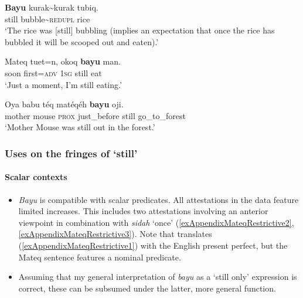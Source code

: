 \begin{exe}
	\ex \label{exAppendixMateq1}
	\gll \textbf{Bayu} kurak\sim kurak tubiq.\\
	still bubble\sim\textsc{redupl} rice\\
	\glt \lq The rice was [still] bubbling (implies an expectation that once the rice has bubbled it will be scooped out and eaten).\rq{ }\parencite[137–138]{Connell2013}
	
	\ex \label{exAppendixMateq2}
	\gll  Mateq tuet=n, okoq \textbf{bayu} man.\\
	soon first=\textsc{adv} 1\textsc{sg} still eat\\
	\glt \lq Just a moment, I'm still eating.' \parencite[148]{Connell2013}

	\ex \label{exAppendixMateq3}
	\gll Oya babu téq matéqéh \textbf{bayu} oji.\\
	mother mouse \textsc{prox} just\_before still go\_to\_forest\\
	\glt \lq Mother Mouse was still out in the forest.\rq{ }\parencite[138]{Connell2013}
\end{exe}

\subsubsection{Uses on the fringes of \lq{}still\rq{}}

\paragraph{Scalar contexts}\label{appendixMateqThusFarOnly}
\begin{itemize}
	\item \textit{Bayu} is compatible with scalar predicates. All attestations in the data feature limited increases.  This includes two attestations involving an anterior viewpoint in combination with \textit{sidah} \lq once\rq{ }(\ref{exAppendixMateqRestrictive2}, \ref{exAppendixMateqRestrictive3}). Note that \citeauthor{Connell2013} translates (\ref{exAppendixMateqRestrictive1}) with the English present perfect, but the Mateq sentence features a nominal predicate.
	\item Assuming that my general interpretation of \textit{bayu} as a \lq still only\rq{ }expression is correct, these can be subsumed under the latter, more general function.
\end{itemize}

